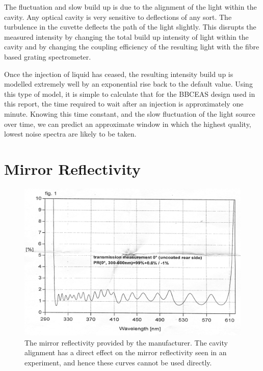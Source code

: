The fluctuation and slow build up is due to the alignment of the light within
the cavity. Any optical cavity is very sensitive to deflections of any sort.
The turbulence in the cuvette deflects the path of the light slightly.
This disrupts the measured intensity by changing the total build up intensity
of light within the cavity and by changing the coupling efficiency of the
resulting light with the fibre based grating spectrometer.

Once the injection of liquid has ceased, the resulting intensity build
up is modelled extremely well by an exponential rise back to the default
value. Using this type of model, it is simple to calculate that for the
\ac{BBCEAS} design used in this report, the time required to wait after an
injection is approximately one minute.
Knowing this time constant, and the slow fluctuation of the light source over
time, we can predict an approximate window in which the highest quality,
lowest noise spectra are likely to be taken.

\section{Mirror Reflectivity}\label{sec:mirror_considerations}

\begin{figure}
\begin{center}
\includegraphics[width=\textwidth]{figures/mirrors.jpg}
\end{center}
\caption{The mirror reflectivity provided by the manufacturer. The cavity alignment has a direct effect on the mirror reflectivity seen in an experiment, and hence these curves cannot be used directly.}
\label{fig:mirror}
\end{figure}

